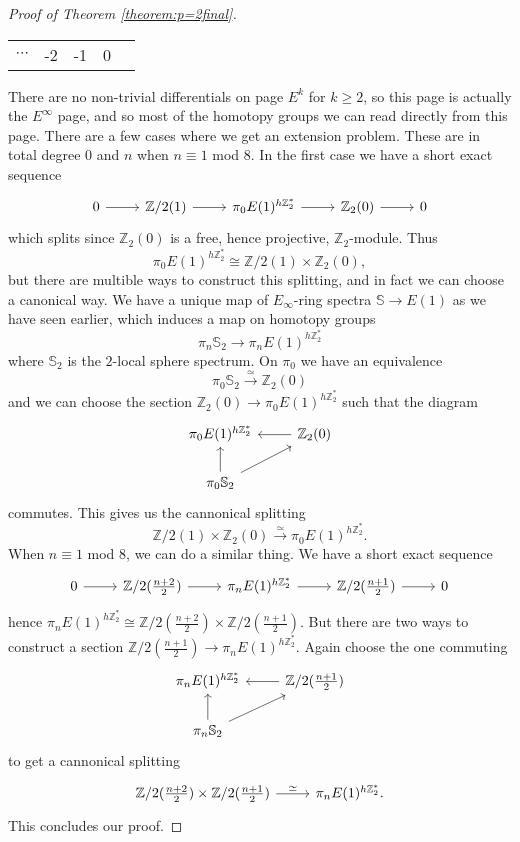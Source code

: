 \documentclass[a4paper]{article} %
\theoremstyle{definition}
\newcommand{\toWithMapLong}[1]{\overset{#1}{\longrightarrow}}
\newcommand{\Z}{\mathbb{Z}}
\newcommand{\Sph}{\mathbb{S}}
\begin{document}
\begin{proof}[Proof of Theorem \ref{theorem:p=2final}]
\begin{table}[H]
\begin{tabular}{cccc|c}
  $\cdots$  & -2 & -1 & 0 &
  \end{tabular}
  \end{table}
  \noindent There are no non-trivial differentials on page $E^k$ for $k \ge 2$, so this page is actually the $E^\infty$ page, and so most of the homotopy groups we can read directly from this page. There are a few cases where we get an extension problem. These are in total degree $0$ and $n$ when $n \equiv 1$ mod $8$. In the first case we have a short exact sequence
  \[
  \begin{tikzcd}
    0 \rar & \Z/2(1) \rar & \pi_0E(1)^{h\Z_2^*} \rar & \Z_2(0) \rar & 0
  \end{tikzcd}
  \]
  which splits since $\Z_2(0)$ is a free, hence projective, $\Z_2$-module. Thus
  \[
  \pi_0E(1)^{h\Z_2^*} \cong \Z/2(1) \times \Z_2(0),
  \]
  but there are multible ways to construct this splitting, and in fact we can choose a canonical way. We have a unique map of $E_\infty$-ring spectra $\Sph \to E(1)$ as we have seen earlier, which induces a map on homotopy groups
  \[
  \pi_n \Sph_2 \to \pi_nE(1)^{h\Z_2^*}
  \]
  where $\Sph_2$ is the $2$-local sphere spectrum. On $\pi_0$ we have an equivalence
  \[
  \pi_0\Sph_2 \toWithMapLong{\simeq} \Z_2(0)
  \]
  and we can choose the section $\Z_2(0) \to \pi_0 E(1)^{h\Z_2^*}$ such that the diagram
  \[
  \begin{tikzcd}
    \pi_0E(1)^{h\Z_2^*} & \Z_2(0) \lar \\
    \pi_0 \Sph_2 \arrow{u} \arrow{ur} &
  \end{tikzcd}
  \]
  commutes. This gives us the cannonical splitting
  \[
  \Z/2(1) \times \Z_2(0) \toWithMapLong{\simeq} \pi_0E(1)^{h\Z_2^*}.
  \]
  When $n \equiv 1$ mod $8$, we can do a similar thing. We have a short exact sequence
  \[
  \begin{tikzcd}
    0 \rar & \Z/2(\frac{n+2}{2}) \rar & \pi_nE(1)^{h\Z_2^*} \rar & \Z/2(\frac{n+1}{2}) \rar & 0
  \end{tikzcd}
  \]
  hence $\pi_nE(1)^{h\Z_2^*} \cong \Z/2(\frac{n+2}{2}) \times \Z/2 (\frac{n+1}{2})$. But there are two ways to construct a section $\Z/2(\frac{n+1}{2}) \to \pi_nE(1)^{h\Z_2^*}$. Again choose the one commuting
  \[
  \begin{tikzcd}
    \pi_nE(1)^{h\Z_2^*} & \Z/2(\frac{n+1}{2}) \lar \\
    \pi_n \Sph_2 \arrow{u} \arrow{ur} &
  \end{tikzcd}
  \]
  to get a cannonical splitting
  \[
  \begin{tikzcd}
    \Z/2(\frac{n+2}{2}) \times \Z/2(\frac{n+1}{2}) \rar{\simeq} & \pi_nE(1)^{h\Z_2^*}.
  \end{tikzcd}
  \]
  This concludes our proof.
\end{proof}
\end{document}
